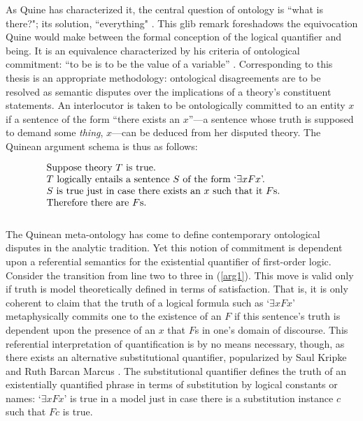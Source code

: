 \documentclass[12pt,letterpaper]{article}
\newenvironment{te}
{\begin{singlespace}
\begin{equation}
\begin{minipage}[t]{0.8\linewidth}}
{\end{minipage}
\end{equation}
\end{singlespace}
\ignorespacesafterend}
\begin{document}
\begin{doublespace}

  As Quine has characterized it, the central question of ontology is
  ``what is there?"; its solution, ``everything"
  \cite[p.1]{quine}. This glib remark foreshadows the equivocation
  Quine would make between the formal conception of the logical
  quantifier and being.  It is an equivalence characterized by his
  criteria of ontological commitment: ``to be is to be the value of a
  variable'' \cite[p.15]{quine}.  Corresponding to this
  thesis is an appropriate methodology: ontological disagreements are
  to be resolved as semantic disputes over the implications of a
  theory's constituent statements.  An interlocutor is taken to be
  ontologically committed to an entity $x$ if a sentence of the form
  ``there exists an $x$''---a sentence whose truth is supposed to
  demand some \emph{thing}, $x$---can be deduced from her disputed
  theory.  The Quinean argument schema is thus as follows:

\begin{te}
  Suppose theory $T$ is true.\\
  $T$ logically entails a sentence $S$ of the form `$\exists xFx$'.\\
  $S$ is true just in case there exists an $x$ such that it $F$s.\\
  Therefore there are $F$s.\\
\end{te}\label{arg1}

The Quinean meta-ontology has come to define contemporary ontological
disputes in the analytic tradition.  Yet this notion of commitment is
dependent upon a referential semantics for the existential quantifier
of first-order logic.  Consider the transition from line two to three
in (\ref{arg1}). This move is valid only if truth is model
theoretically defined in terms of satisfaction. That is, it is only
coherent to claim that the truth of a logical formula such as
`$\exists xFx$' metaphysically commits one to the existence of an $F$
if this sentence's truth is dependent upon the presence of an $x$ that
$F$s in one's domain of discourse.  This referential interpretation of
quantification is by no means necessary, though, as there exists an
alternative substitutional quantifier, popularized by Saul Kripke
\cite{kripke} and Ruth Barcan Marcus \cite{marcus72}.  The
substitutional quantifier defines the truth of an existentially
quantified phrase in terms of substitution by logical constants or
names: `$\exists xFx$' is true in a model just in case there is a
substitution instance $c$ such that $Fc$ is true.


\end{doublespace}
\end{document}
